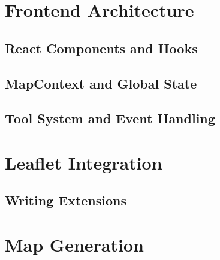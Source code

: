 \section{Frontend Architecture}

\subsection{React Components and Hooks}

\subsection{MapContext and Global State}

\subsection{Tool System and Event Handling}

\section{Leaflet Integration}

\subsection{Writing Extensions}

\section{Map Generation}

